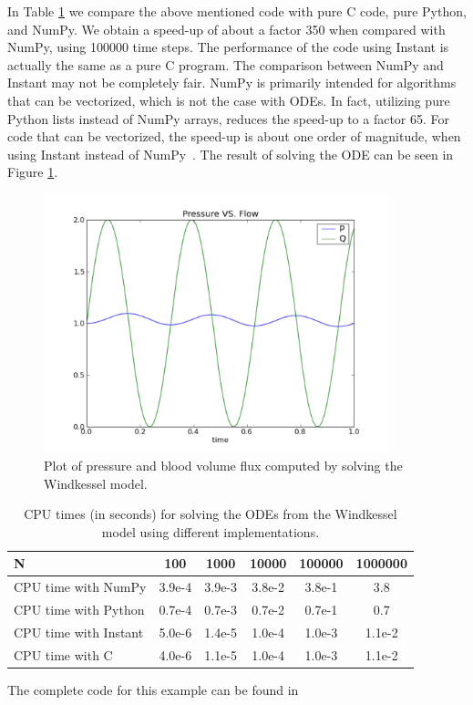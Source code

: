 In Table \ref{wilbers:fig:speed-up} we compare the above mentioned code with
pure C code, pure Python, and NumPy.  
We obtain a speed-up of about a factor 350 when compared with NumPy, using
100000 time steps. The performance of the code using Instant is actually the same as a pure C program. 
The comparison between NumPy and Instant may not be
completely fair. NumPy is primarily intended for algorithms that can be vectorized,
which is not the case with ODEs. In fact, utilizing pure Python
lists instead of NumPy arrays, reduces the speed-up to a factor 65. For code
that can be vectorized, the speed-up is about one order of magnitude, when 
using Instant instead of NumPy~\cite{IIIBehieTrangenstein1988}.
The result of solving the ODE can be seen in Figure
\ref{wilbers:fig:fig1}. 

\begin{figure}
\begin{center}
\includegraphics[width=100mm]{chapters/wilbers/pdf/pressure_plot.pdf}
\caption{Plot of pressure and blood volume flux computed by solving the Windkessel model.}
\label{wilbers:fig:fig1}
\end{center}
\end{figure}

\begin{table}[h]
\begin{center}
\begin{tabular}{|l|c|c|c|c|c|} \hline
N                     & 100     & 1000   & 10000  & 100000 & 1000000 \\ \hline
CPU time with NumPy   & 3.9e-4  & 3.9e-3 & 3.8e-2 & 3.8e-1 & 3.8     \\ \hline
CPU time with Python  & 0.7e-4  & 0.7e-3 & 0.7e-2 & 0.7e-1 & 0.7     \\ \hline
CPU time with Instant & 5.0e-6  & 1.4e-5 & 1.0e-4 & 1.0e-3 & 1.1e-2  \\ \hline
CPU time with C       & 4.0e-6  & 1.1e-5 & 1.0e-4 & 1.0e-3 & 1.1e-2  \\ \hline
\end{tabular}
\caption{CPU times (in seconds) for solving the ODEs from the  Windkessel model using different implementations.}
\label{wilbers:fig:speed-up}
\end{center}
\end{table}
The complete code for this example can be found in 



